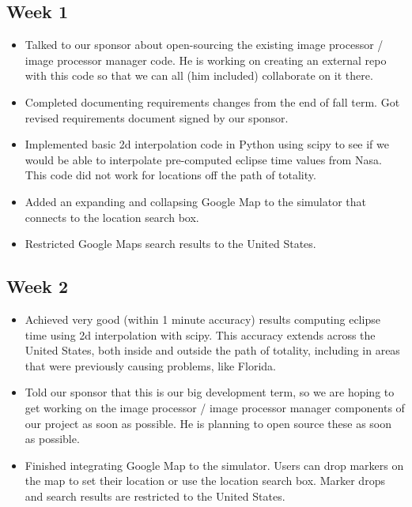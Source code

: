 \documentclass[10pt, onecolumn, draftclsnofoot, letterpaper, compsoc]{IEEEtran}
\begin{document}
\subsection{Week 1}

    \begin{itemize}

	\item Talked to our sponsor about open-sourcing the existing image processor /
		  image processor manager code. He is working on creating an external repo with
		  this code so that we can all (him included) collaborate on it there.

	\item Completed documenting requirements changes from the end of fall term. Got
		  revised requirements document signed by our sponsor.

	\item Implemented basic 2d interpolation code in Python using scipy to see if we
		  would be able to interpolate pre-computed eclipse time values from Nasa.
		  This code did not work for locations off the path of totality.

    \item Added an expanding and collapsing Google Map to the simulator that connects
          to the location search box.

    \item Restricted Google Maps search results to the United States.

    \end{itemize}

\subsection{Week 2}

    \begin{itemize}

    \item Achieved very good (within 1 minute accuracy) results computing eclipse time
		  using 2d interpolation with scipy. This accuracy extends across the United
		  States, both inside and outside the path of totality, including in areas that
		  were previously causing problems, like Florida.

	\item Told our sponsor that this is our big development term, so we are hoping to get
		  working on the image processor / image processor manager components of our
		  project as soon as possible. He is planning to open source these as soon as
		  possible.

    \item Finished integrating Google Map to the simulator. Users can drop markers on the
          map to set their location or use the location search box. Marker drops and search
          results are restricted to the United States.

    \end{itemize}
\end{document}

